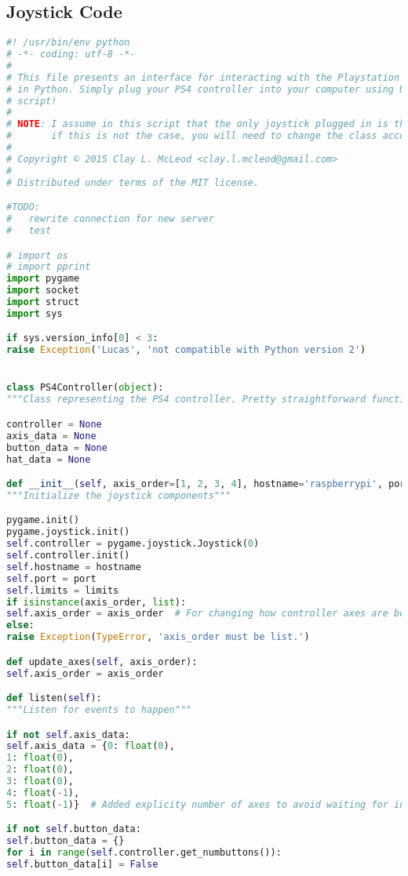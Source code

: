 \subsection{Joystick Code}
\label{appendix:controller}
\lstset{basicstyle=\tiny}
\begin{lstlisting}[language=Python,caption={PS4Controller.py},label={lst:PS4Controller.py}]
#! /usr/bin/env python
# -*- coding: utf-8 -*-
#
# This file presents an interface for interacting with the Playstation 4 Controller
# in Python. Simply plug your PS4 controller into your computer using USB and run this
# script!
#
# NOTE: I assume in this script that the only joystick plugged in is the PS4 controller.
#       if this is not the case, you will need to change the class accordingly.
#
# Copyright © 2015 Clay L. McLeod <clay.l.mcleod@gmail.com>
#
# Distributed under terms of the MIT license.

#TODO:
#   rewrite connection for new server
#   test

# import os
# import pprint
import pygame
import socket
import struct
import sys

if sys.version_info[0] < 3:
raise Exception('Lucas', 'not compatible with Python version 2')


class PS4Controller(object):
"""Class representing the PS4 controller. Pretty straightforward functionality."""

controller = None
axis_data = None
button_data = None
hat_data = None

def __init__(self, axis_order=[1, 2, 3, 4], hostname='raspberrypi', port=2222, limits = [10, 10, 1, 10]):
"""Initialize the joystick components"""

pygame.init()
pygame.joystick.init()
self.controller = pygame.joystick.Joystick(0)
self.controller.init()
self.hostname = hostname
self.port = port
self.limits = limits
if isinstance(axis_order, list):
self.axis_order = axis_order  # For changing how controller axes are bound
else:
raise Exception(TypeError, 'axis_order must be list.')

def update_axes(self, axis_order):
self.axis_order = axis_order

def listen(self):
"""Listen for events to happen"""

if not self.axis_data:
self.axis_data = {0: float(0),
1: float(0),
2: float(0),
3: float(0),
4: float(-1),
5: float(-1)}  # Added explicity number of axes to avoid waiting for input

if not self.button_data:
self.button_data = {}
for i in range(self.controller.get_numbuttons()):
self.button_data[i] = False


\end{lstlisting}
